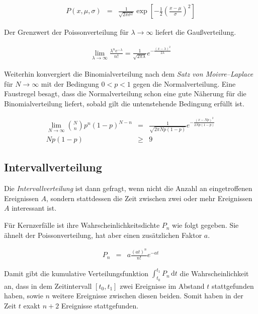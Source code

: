 \documentclass[12pt,a4paper]{scrartcl}
\numberwithin{equation}{section} %
\renewcommand{\[}{} %
\renewcommand{\]}{\noindent} %
\begin{document}
\begin{eqnarray}
	P(x,\mu,\sigma) &=& \frac{1}{\sqrt{2 \pi\sigma^2}} \exp\left[- \frac{1}{2} \left(\frac{x - \mu}{\sigma}\right)^2\right]
\end{eqnarray}

\noindent
Der Grenzwert der Poissonverteilung für $\lambda \rightarrow \infty$ liefert die Gaußverteilung.

\begin{eqnarray}
	\lim_{\lambda \rightarrow \infty} \frac{\lambda^n e^{-\lambda}}{n!} = \frac{1}{\sqrt{2 \pi \lambda}} e^{- \frac{(x-\lambda)^2}{2\lambda}}
\end{eqnarray}

\noindent
Weiterhin konvergiert die Binomialverteilung nach dem \emph{Satz von Moivre--Laplace} für $N \rightarrow \infty$ mit der Bedingung $0 < p < 1$ gegen die Normalverteilung. Eine Faustregel besagt, dass die Normalverteilung schon eine gute Näherung für die Binomialverteilung liefert, sobald gilt die untenstehende Bedingung erfüllt ist.

\begin{eqnarray}
	\lim_{N \rightarrow \infty} \binom{N}{n} p^n (1-p)^{N-n}
		&=& \frac{1}{\sqrt{2 \pi N p (1-p)}} e^{- \frac{(x - Np)^2}{2 N p (1-p)}} \\
	Np (1-p) &\geq& 9
\end{eqnarray}

\hypertarget{Intervallverteilung}{\subsection{Intervallverteilung}\label{Intervallverteilung}}
Die \emph{Intervallverteilung} ist dann gefragt, wenn nicht die Anzahl an eingetroffenen Ereignissen $A$, sondern stattdessen die Zeit zwischen zwei oder mehr Ereignissen $A$ interessant ist.

Für Kernzerfälle ist ihre Wahrscheinlichkeitsdichte $P_n$ wie folgt gegeben. Sie ähnelt der Poissonverteilung, hat aber einen zusätzlichen Faktor $a$.

\begin{eqnarray}
	P_n &=& a \frac{(at)^n}{n!} e^{-at}
\end{eqnarray}

\noindent
Damit gibt die kumulative Verteilungsfunktion $\int_{t_0}^{t_1} P_n \,\mathrm dt \label{eq:P_n_int}$ die Wahrscheinlichkeit an, dass in dem Zeitintervall $[t_0,t_1]$ zwei Ereignisse im Abstand $t$ stattgefunden haben, sowie $n$ weitere Ereignisse zwischen diesen beiden. Somit haben in der Zeit $t$ exakt $n+2$ Ereignisse stattgefunden.
\end{document}
